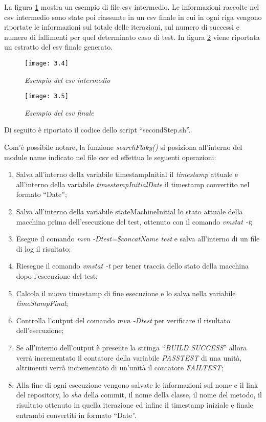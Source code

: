 La figura \ref{fig:csvIntermedio} mostra un esempio di file csv intermedio. Le informazioni raccolte nel csv intermedio sono state poi riassunte in un csv finale in cui in ogni riga vengono riportate le informazioni sul totale delle iterazioni, sul numero di successi e numero di fallimenti per quel determinato caso di test. In figura \ref{fig:csvFinale} viene riportata un estratto del csv finale generato.
\newpage
\begin{figure}[h]
	\centering
	\texttt{[image: 3.4]}
	\caption{\emph{Esempio del csv intermedio}}
	\label{fig:csvIntermedio}
\end{figure}
\newpage
\begin{figure}[h]
	\centering
	\texttt{[image: 3.5]}
	\caption{\emph{Esempio del csv finale}}
	\label{fig:csvFinale}
\end{figure}

Di seguito è riportato il codice dello script “secondStep.sh”.


Com’è possibile notare, la funzione \emph{searchFlaky()} si posiziona all’interno del module name indicato nel file csv ed effettua le seguenti operazioni:
\begin{enumerate}
	\item Salva all’interno della variabile timestampInitial il \emph{timestamp} attuale e all’interno della variabile \emph{timestampInitialDate} il timestamp convertito nel
	formato “Date”;
	\item Salva all’interno della variabile stateMachineInitial lo stato attuale della macchina prima dell’esecuzione del test, ottenuto con il comando \emph{vmstat -t};
	\item Esegue il comando \emph{mvn -Dtest=\$concatName test} e salva all’interno di un file di log il risultato;
	\item Riesegue il comando \emph{vmstat -t} per tener traccia dello stato della macchina dopo l’esecuzione del test;
	\item Calcola il nuovo timestamp di fine esecuzione e lo salva nella variabile	\emph{timeStampFinal};
	\item Controlla l’output del comando \emph{mvn -Dtest} per verificare il risultato dell’esecuzione;
	\item Se all’interno dell’output è presente la stringa “\emph{BUILD SUCCESS}” allora verrà incrementato il contatore della variabile \emph{PASSTEST} di una unità, altrimenti verrà incrementato di un’unità il contatore \emph{FAILTEST};
	\item Alla fine di ogni esecuzione vengono salvate le informazioni sul nome e il
	link del repository, lo \emph{sha} della commit, il nome della classe, il nome del metodo, il risultato ottenuto in quella iterazione ed infine il timestamp iniziale e finale entrambi convertiti in formato “Date”.
\end{enumerate}

